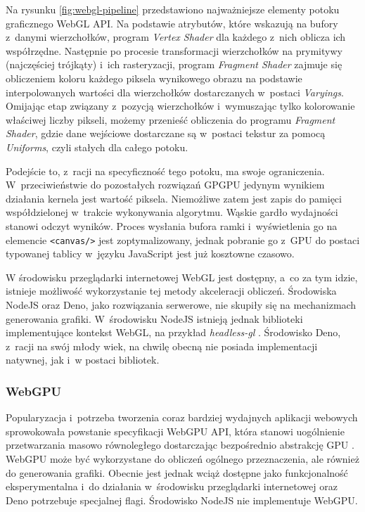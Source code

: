 Na rysunku \ref{fig:webgl-pipeline} przedstawiono najważniejsze elementy potoku graficznego WebGL API. Na podstawie atrybutów, które wskazują na bufory z~danymi wierzchołków, program \textit{Vertex Shader} dla każdego z~nich oblicza ich współrzędne. Następnie po procesie transformacji wierzchołków na prymitywy (najczęściej trójkąty) i~ich rasteryzacji, program \textit{Fragment Shader} zajmuje się obliczeniem koloru każdego piksela wynikowego obrazu na podstawie interpolowanych wartości dla wierzchołków dostarczanych w~postaci \textit{Varyings}. Omijając etap związany z~pozycją wierzchołków i~wymuszając tylko kolorowanie właściwej liczby pikseli, możemy przenieść obliczenia do programu \textit{Fragment Shader}, gdzie dane wejściowe dostarczane są w~postaci tekstur za pomocą \textit{Uniforms}, czyli stałych dla całego potoku.

Podejście to, z~racji na specyficzność tego potoku, ma swoje ograniczenia. W~przeciwieństwie do pozostałych rozwiązań GPGPU jedynym wynikiem działania kernela jest wartość piksela. Niemożliwe zatem jest zapis do pamięci współdzielonej w~trakcie wykonywania algorytmu. Wąskie gardło wydajności stanowi odczyt wyników. Proces wysłania bufora ramki i~wyświetlenia go na elemencie \lstinline{<canvas/>} jest zoptymalizowany, jednak pobranie go z~GPU do postaci typowanej tablicy w~języku JavaScript jest już kosztowne czasowo.

W środowisku przeglądarki internetowej WebGL jest dostępny, a~co za tym idzie, istnieje możliwość wykorzystanie tej metody akceleracji obliczeń. Środowiska NodeJS oraz Deno, jako rozwiązania serwerowe, nie skupiły się na mechanizmach generowania grafiki. W~środowisku NodeJS istnieją jednak biblioteki implementujące kontekst WebGL, na przykład \textit{headless-gl} \cite{headless-gl}. Środowisko Deno, z~racji na swój młody wiek, na chwilę obecną nie posiada implementacji natywnej, jak i~w postaci bibliotek. 

\subsubsection{WebGPU}

Popularyzacja i~potrzeba tworzenia coraz bardziej wydajnych aplikacji webowych sprowokowała powstanie specyfikacji WebGPU API, która stanowi uogólnienie przetwarzania masowo równoległego dostarczając bezpośrednio abstrakcję GPU \cite{webgpu_2022}. WebGPU może być wykorzystane do obliczeń ogólnego przeznaczenia, ale również do generowania grafiki. Obecnie jest jednak wciąż dostępne jako funkcjonalność eksperymentalna i~do działania w~środowisku przeglądarki internetowej oraz Deno potrzebuje specjalnej flagi. Środowisko NodeJS nie implementuje \mbox{WebGPU}.

